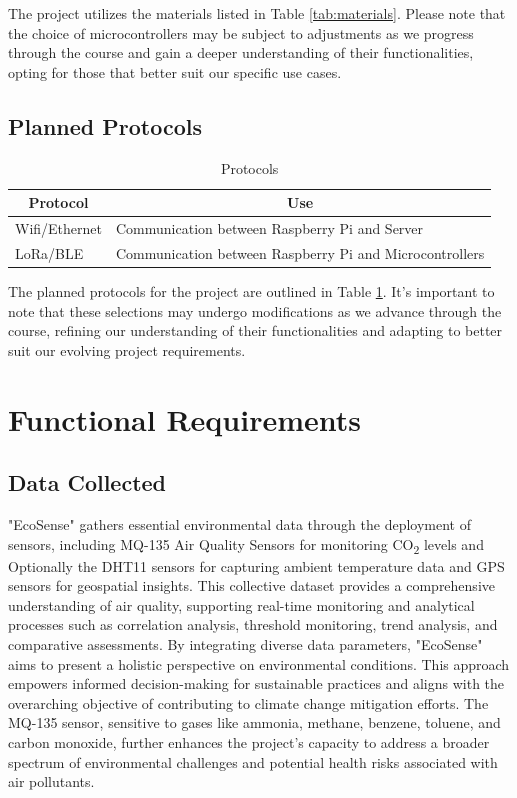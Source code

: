 \documentclass[conference]{IEEEtran}
\begin{document}
The project utilizes the materials listed in Table \ref{tab:materials}. Please note that the choice of microcontrollers may be subject to adjustments as we progress through the course and gain a deeper understanding of their functionalities, opting for those that better suit our specific use cases.

\subsection{Planned Protocols}

\begin{table}[htbp]
  \caption{Protocols}\label{tab:protocols}
  \centering
    \begin{tabular}[c]{l|l}
      \hline
      \multicolumn{1}{c|}{\textbf{Protocol}} & 
      \multicolumn{1}{c}{\textbf{Use}} \\
      \hline
      Wifi/Ethernet & Communication between Raspberry Pi and Server \\
      \hline
      LoRa/BLE & Communication between Raspberry Pi and Microcontrollers \\
      \hline
    \end{tabular}
\end{table}

The planned protocols for the project are outlined in Table \ref{tab:protocols}. It's important to note that these selections may undergo modifications as we advance through the course, refining our understanding of their functionalities and adapting to better suit our evolving project requirements.

\section{Functional Requirements}

\subsection{Data Collected}

 "EcoSense" gathers essential environmental data through the deployment of sensors, including MQ-135 Air Quality Sensors for monitoring CO\textsubscript{2} levels and Optionally the DHT11 sensors for capturing ambient temperature data and GPS sensors for geospatial insights. This collective dataset provides a comprehensive understanding of air quality, supporting real-time monitoring and analytical processes such as correlation analysis, threshold monitoring, trend analysis, and comparative assessments. By integrating diverse data parameters, "EcoSense" aims to present a holistic perspective on environmental conditions. This approach empowers informed decision-making for sustainable practices and aligns with the overarching objective of contributing to climate change mitigation efforts. The MQ-135 sensor, sensitive to gases like ammonia, methane, benzene, toluene, and carbon monoxide, further enhances the project's capacity to address a broader spectrum of environmental challenges and potential health risks associated with air pollutants.
\end{document}
